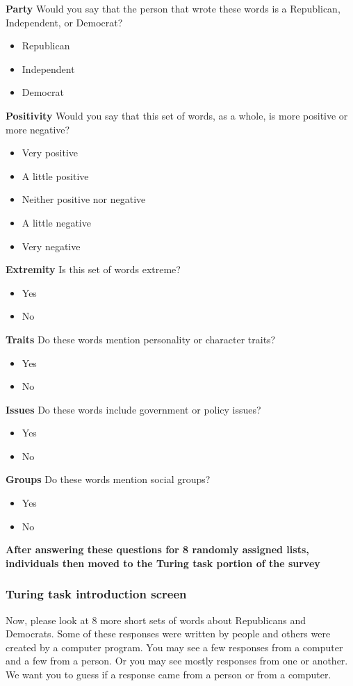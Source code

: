 \documentclass[11pt]{article}
\begin{document}
\noindent\textbf{Party} Would you say that the person that wrote these words is a Republican, Independent, or Democrat?
\begin{itemize}
  \item Republican
  \item Independent
  \item Democrat
\end{itemize}
\textbf{Positivity} Would you say that this set of words, as a whole, is more positive or more negative?
\begin{itemize}
  \item Very positive
  \item A little positive
  \item Neither positive nor negative
  \item A  little negative
  \item Very negative
\end{itemize}
\textbf{Extremity} Is this set of words extreme?
\begin{itemize}
  \item Yes
  \item No
\end{itemize}
\textbf{Traits} Do these words mention personality or character traits?
\begin{itemize}
  \item Yes
  \item No
\end{itemize}
\textbf{Issues} Do these words include government or policy issues?
\begin{itemize}
  \item Yes
  \item No
\end{itemize}
\textbf{Groups} Do these words mention social groups?
\begin{itemize}
  \item Yes
  \item No
\end{itemize}

\noindent\textbf{After answering these questions for 8 randomly assigned lists, individuals then moved to the Turing task portion of the survey}

\subsubsection*{Turing task introduction screen}
Now, please look at 8 more short sets of words about Republicans and Democrats. Some of these responses were written by people and others were created by a computer program. You may see a few responses from a computer and a few from a person. Or you may see mostly responses from one or another. We want you to guess if a response came from a person or from a computer.
\end{document}
